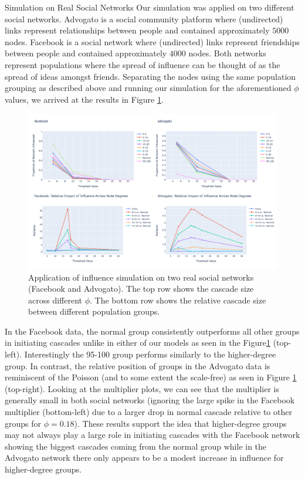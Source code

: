 \documentclass[10pt, oneside, reqno]{amsart}
\makeatletter
\theoremstyle{plain}%
\theoremstyle{definition}
\theoremstyle{remark}
\renewcommand\subsection{\@startsection{subsection}{2}%
  \z@{.5\linespacing\@plus.7\linespacing}{-.5em}%
  {\normalfont\scshape}}
\makeatother
\begin{document}
\subsection{Simulation on Real Social Networks}
Our simulation was applied on two different social networks. 
Advogato \cite{advogato} is a social community platform  where (undirected) links represent relationships between people and contained approximately $5000$ nodes. 
Facebook \cite{facebook} is a social network where (undirected) links represent friendships between people and contained approximately $4000$ nodes.
Both networks represent populations where the spread of influence can be thought of as the spread of ideas amongst friends.
Separating the nodes using the same population grouping as described above and running our simulation for the aforementioned $\phi$ values, we arrived at the results in Figure \ref{RealDat}.

\begin{figure}[ht]
    \includegraphics[scale=0.2]{Report/figs/RealDat.png}
    \caption{Application of influence simulation on two real social networks (Facebook and Advogato). The top row shows the cascade size across different $\phi$. The bottom row shows the relative cascade size between different population groups.}
    \label{RealDat}
\end{figure}

In the Facebook data, the normal group consistently outperforms all other groups in initiating cascades unlike in either of our models as seen in the Figure\ref{RealDat} (top-left).
Interestingly the 95-100 group performs similarly to the higher-degree group.
In contrast, the relative position of groups in the Advogato data is reminiscent of the Poisson (and to some extent the scale-free) as seen in Figure \ref{RealDat} (top-right).
Looking at the multiplier plots, we can see that the multiplier is generally small in both social networks (ignoring the large spike in the Facebook multiplier (bottom-left) due to a larger drop in normal cascade relative to other groups for $\phi=0.18$).
These results support the idea that higher-degree groups may not always play a large role in initiating cascades with the Facebook network showing the biggest cascades coming from the normal group while in the Advogato network there only appears to be a modest increase in influence for higher-degree groups.
\end{document}
